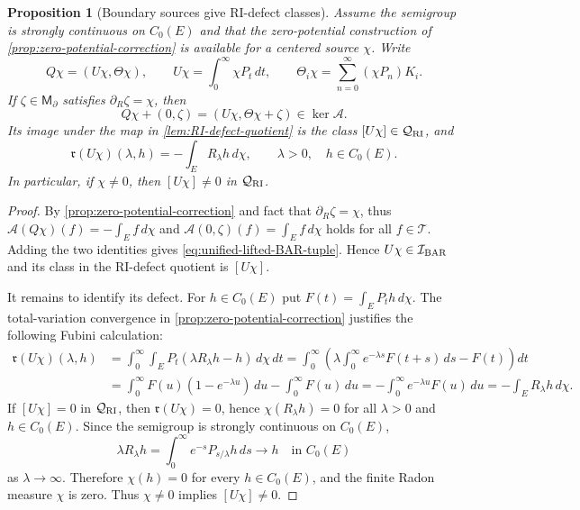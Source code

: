 \documentclass[aihp]{imsart}
\numberwithin{equation}{section}
\theoremstyle{plain}
\newtheorem{proposition}[proposition]{Proposition}
\theoremstyle{definition}
\newcommand{\1}{\mathbf 1}
\begin{document}
\begin{proposition}[Boundary sources give RI-defect classes]\label{prop:boundary-source-RI-defect}
Assume the semigroup is strongly continuous on $C_0(E)$ and that the zero-potential construction of \cref{prop:zero-potential-correction} is available for a centered source $\chi$.  Write
\[
 Q\chi=(U\chi,\Theta\chi),
 \qquad
 U\chi=\int_0^\infty\chi P_t\,dt,
 \qquad
 \Theta_i\chi=\sum_{n=0}^\infty(\chi P_n)K_i.
\]
If $\zeta\in\mathsf M_\partial$ satisfies $\partial_R\zeta=\chi$, then
\begin{equation}\label{eq:unified-lifted-BAR-tuple}
 Q\chi+(0,\zeta)
 =(U\chi,\Theta\chi+\zeta)
 \in\ker\mathcal A.
\end{equation}
Its image under the map in \cref{lem:RI-defect-quotient} is the class $[U\chi]\in\mathcal Q_{\rm RI}$, and
\begin{equation}\label{eq:unified-defect-of-potential}
 \mathfrak r(U\chi)(\lambda,h)
 =-\int_E R_\lambda h\,d\chi,
 \qquad \lambda>0,\quad h\in C_0(E).
\end{equation}
In particular, if $\chi\ne0$, then $[U\chi]\ne0$ in $\mathcal Q_{\rm RI}$.
\end{proposition}

\begin{proof}
By \cref{prop:zero-potential-correction} and fact that $\partial_R\zeta=\chi$, thus $\mathcal A(Q\chi)(f)=-\int_E f\,d\chi$ and $\mathcal A(0,\zeta)(f)=\int_E f\,d\chi$ holds for all $f\in\mathcal T$. Adding the two identities gives \eqref{eq:unified-lifted-BAR-tuple}.  Hence $U\chi\in\mathcal I_{\rm BAR}$ and its class in the RI-defect quotient is $[U\chi]$.

It remains to identify its defect.  For $h\in C_0(E)$ put $F(t)=\int_E P_t h\,d\chi.$ The total-variation convergence in \cref{prop:zero-potential-correction} justifies the following Fubini calculation:
\begin{align*}
 \mathfrak r(U\chi)(\lambda,h)
 &=\int_0^\infty
    \int_E P_t(\lambda R_\lambda h-h)\,d\chi\,dt  =\int_0^\infty
    \left(\lambda\int_0^\infty e^{-\lambda s}F(t+s)\,ds-F(t)\right)dt  \\
 &=\int_0^\infty F(u)(1-e^{-\lambda u})\,d u
   -\int_0^\infty F(u)\,du  =-\int_0^\infty e^{-\lambda u}F(u)\,du
  =-\int_E R_\lambda h\,d\chi.
\end{align*}
If $[U\chi]=0$ in $\mathcal Q_{\rm RI}$, then $\mathfrak r(U\chi)=0$, hence $\chi(R_\lambda h)=0$ for all $\lambda>0$ and $h\in C_0(E)$.  Since the semigroup is strongly continuous on $C_0(E)$,
\[
 \lambda R_\lambda h
 =\int_0^\infty e^{-s}P_{s/\lambda}h\,ds
 \longrightarrow h
 \quad\text{in }C_0(E)
\]
as $\lambda\to\infty$.  Therefore $\chi(h)=0$ for every $h\in C_0(E)$, and the finite Radon measure $\chi$ is zero.  Thus $\chi\ne0$ implies $[U\chi]\ne0$.
\end{proof}
\end{document}
